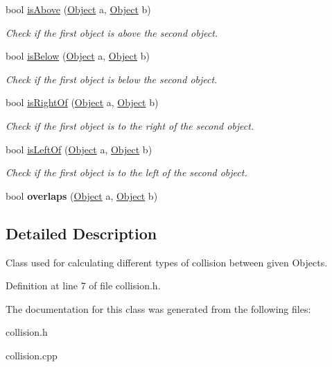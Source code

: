 \begin{DoxyCompactItemize}
bool \hyperlink{classCollision_aecbf1758ca3a93a39568dbdf87213f20}{is\+Above} (\hyperlink{classObject}{Object} a, \hyperlink{classObject}{Object} b)
\begin{DoxyCompactList}\small\item\em Check if the first object is above the second object. \end{DoxyCompactList}\item 
\mbox{\label{classCollision_ad5414ecc098c7d63155aea827c7d68b1}} 
bool \hyperlink{classCollision_ad5414ecc098c7d63155aea827c7d68b1}{is\+Below} (\hyperlink{classObject}{Object} a, \hyperlink{classObject}{Object} b)
\begin{DoxyCompactList}\small\item\em Check if the first object is below the second object. \end{DoxyCompactList}\item 
\mbox{\label{classCollision_a9330290516beca87905e81a974ffca83}} 
bool \hyperlink{classCollision_a9330290516beca87905e81a974ffca83}{is\+Right\+Of} (\hyperlink{classObject}{Object} a, \hyperlink{classObject}{Object} b)
\begin{DoxyCompactList}\small\item\em Check if the first object is to the right of the second object. \end{DoxyCompactList}\item 
\mbox{\label{classCollision_aea67f8b0cd9b37408e2f6f65006b27d3}} 
bool \hyperlink{classCollision_aea67f8b0cd9b37408e2f6f65006b27d3}{is\+Left\+Of} (\hyperlink{classObject}{Object} a, \hyperlink{classObject}{Object} b)
\begin{DoxyCompactList}\small\item\em Check if the first object is to the left of the second object. \end{DoxyCompactList}\item 
\mbox{\label{classCollision_a69886d8a162afecf0332b590a17a183b}} 
bool {\bfseries overlaps} (\hyperlink{classObject}{Object} a, \hyperlink{classObject}{Object} b)
\end{DoxyCompactItemize}


\subsection{Detailed Description}
Class used for calculating different types of collision between given Objects. 

Definition at line 7 of file collision.\+h.



The documentation for this class was generated from the following files\+:\begin{DoxyCompactItemize}
\item 
collision.\+h\item 
collision.\+cpp\end{DoxyCompactItemize}
